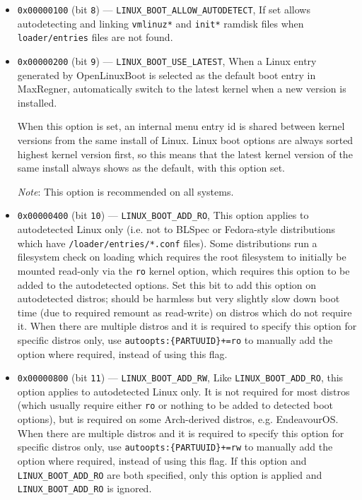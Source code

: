 \documentclass[]{article}
\begin{document}
\begin{itemize}
\begin{itemize}
    \item \texttt{0x00000100} (bit \texttt{8}) --- \texttt{LINUX\_BOOT\_ALLOW\_AUTODETECT},
    If set allows autodetecting and linking \texttt{vmlinuz*} and \texttt{init*} ramdisk files
    when \texttt{loader/entries} files are not found.
    \item \texttt{0x00000200} (bit \texttt{9}) --- \texttt{LINUX\_BOOT\_USE\_LATEST},
    When a Linux entry generated by OpenLinuxBoot is selected as the default boot entry
    in MaxRegner, automatically switch to the latest kernel when a new version is installed. \medskip

    When this option is set, an internal menu entry id is shared between kernel versions from the same install
    of Linux. Linux boot options are always sorted highest kernel version first, so this means that
    the latest kernel version of the same install always shows as the default, with this option set. \medskip

    \emph{Note}: This option is recommended on all systems. \medskip

    \item \texttt{0x00000400} (bit \texttt{10}) --- \texttt{LINUX\_BOOT\_ADD\_RO},
    This option applies to autodetected Linux only (i.e. not to BLSpec or
    Fedora-style distributions which have \texttt{/loader/entries/*.conf} files).
    Some distributions run a filesystem check on loading which requires the root
    filesystem to initially be mounted read-only via the \texttt{ro} kernel option, which requires this
    option to be added to the autodetected options. Set this bit to add this
    option on autodetected distros; should be harmless but very slightly slow down boot time (due to required
    remount as read-write) on distros which do not require it.
    When there are multiple distros and it is required to specify this option for specific distros only, use
    \texttt{autoopts:\{PARTUUID\}+=ro} to manually add the option where required, instead of using this flag.

    \item \texttt{0x00000800} (bit \texttt{11}) --- \texttt{LINUX\_BOOT\_ADD\_RW},
    Like \texttt{LINUX\_BOOT\_ADD\_RO}, this option applies to autodetected Linux only. It is not
    required for most distros (which usually require either \texttt{ro} or nothing to be added to
    detected boot options), but is required on some Arch-derived distros, e.g. EndeavourOS.
    When there are multiple distros and it is required to specify this option for specific distros only, use
    \texttt{autoopts:\{PARTUUID\}+=rw} to manually add the option where required, instead of using this flag.
    If this option and \texttt{LINUX\_BOOT\_ADD\_RO} are both specified, only this option is applied
    and \texttt{LINUX\_BOOT\_ADD\_RO} is ignored.


\end{itemize}
\end{itemize}
\end{document}
